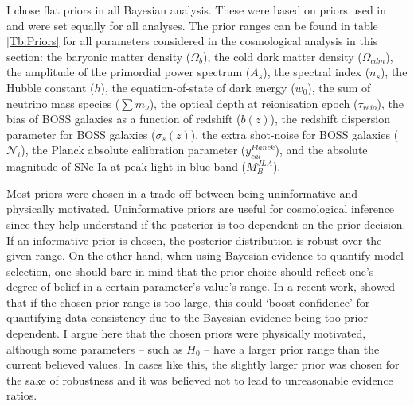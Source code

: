 \qquad I chose flat priors in all Bayesian analysis. These were based on priors used in \cite{JLAdata,2016BOSSCosmology,PlanckCosmology2016,2017arXiv170801530D} and were set equally for all analyses. The prior ranges can be found in table \ref{Tb:Priors} for all parameters considered in the cosmological analysis in this section: the baryonic matter density ($\Omega_b$), the cold dark matter density ($\Omega_{cdm}$), the amplitude of the primordial power spectrum ($A_s$), the spectral index ($n_s$), the Hubble constant ($h$), the equation-of-state of dark energy ($w_0$), the sum of neutrino mass species ($\sum m_{\nu}$), the optical depth at reionisation epoch ($\tau_{reio}$), the bias of BOSS galaxies as a function of redshift ($b(z)$), the redshift dispersion parameter for BOSS galaxies ($\sigma_s(z)$), the extra shot-noise for BOSS galaxies ($\mathcal{N}_i$), the Planck absolute calibration parameter ($y_{cal}^{Planck}$), and the absolute magnitude of SNe Ia at peak light in blue band ($M_B^{JLA}$). 

\qquad Most priors were chosen in a trade-off between being uninformative and physically motivated. Uninformative priors are useful for cosmological inference since they help understand if the posterior is too dependent on the prior decision. If an informative prior is chosen, the posterior distribution is robust over the given range. On the other hand, when using Bayesian evidence to quantify model selection, one should bare in mind that the prior choice should reflect one's degree of belief in a certain parameter's value's range. In a recent work, \cite{2019-HandleyLemos} showed that if the chosen prior range is too large, this could `boost confidence' for quantifying data consistency due to the Bayesian evidence being too prior-dependent. I argue here that the chosen priors were physically motivated, although some parameters -- such as $H_0$ -- have a larger prior range than the current believed values. In cases like this, the slightly larger prior was chosen for the sake of robustness and it was believed not to lead to unreasonable evidence ratios.

